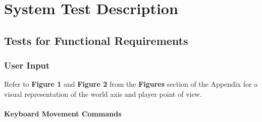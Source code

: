 \documentclass[12pt, titlepage]{article}
\begin{document}
\section{System Test Description}
	
\subsection{Tests for Functional Requirements}

\subsubsection{User Input}

Refer to \textbf{Figure 1} and \textbf{Figure 2} from the \textbf{Figures} section of the Appendix for a visual representation of the world axis and player point of view.
\paragraph{Keyboard Movement Commands}
\end{document}
